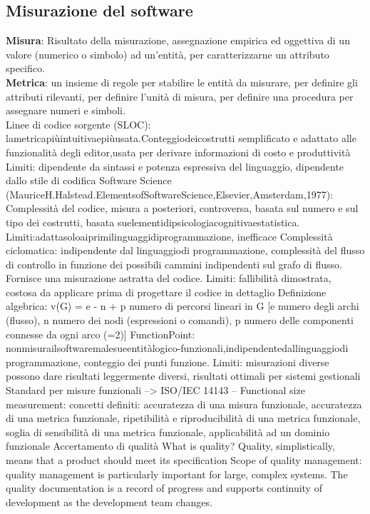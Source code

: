 \subsection{Misurazione del software}
\textbf{Misura}: Risultato della misurazione, assegnazione empirica ed oggettiva di un valore (numerico o simbolo) ad un'entità, per caratterizzarne un attributo specifico.\\
\textbf{Metrica}: un insieme di regole per stabilire le entità da misurare, per definire gli attributi rilevanti, per definire l'unità di misura, per definire una procedura per assegnare numeri e simboli.\\
Linee di codice sorgente (SLOC): lametricapiùintuitivaepiùusata.Conteggiodeicostrutti semplificato e adattato alle funzionalità degli editor,usata per derivare informazioni di costo e produttività Limiti: dipendente da sintassi e potenza espressiva del linguaggio, dipendente dallo stile di codifica
Software Science (MauriceH.Halstead.ElementsofSoftwareScience,Elsevier,Amsterdam,1977): Complessità del codice, misura a posteriori, controversa, basata sul numero e sul tipo dei costrutti, basata suelementidipsicologiacognitivaestatistica. Limiti:adattasoloaiprimilinguaggidiprogrammazione, inefficace
Complessità ciclomatica: indipendente dal linguaggiodi programmazione, complessità del flusso di controllo in funzione dei possibili cammini indipendenti sul grafo di flusso. Fornisce una misurazione astratta del codice. Limiti: fallibilità dimostrata, costosa da applicare prima di progettare il codice in dettaglio
Definizione algebrica: v(G) = e - n + p numero di percorsi lineari in G [e numero degli archi (flusso), n numero dei nodi (espressioni o comandi), p numero delle componenti connesse da ogni arco (=2)]
FunctionPoint: nonmisurailsoftwaremalesueentitàlogico-funzionali,indipendentedallinguaggiodi programmazione, conteggio dei punti funzione. Limiti: misurazioni diverse possono dare risultati leggermente diversi, risultati ottimali per sistemi gestionali
Standard per misure funzionali --> ISO/IEC 14143 – Functional size measurement: concetti definiti: accuratezza di una misura funzionale, accuratezza di una metrica funzionale, ripetibilità e riproducibilità di una metrica funzionale,
soglia di sensibilità di una metrica funzionale, applicabilità ad un dominio funzionale
Accertamento di qualità
What is quality? Quality, simplistically, means that a product should meet its specification
Scope of quality management: quality management is particularly important for large, complex systems. The quality
documentation is a record of progress and supports continuity of development as the development team changes.

